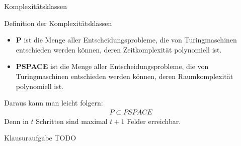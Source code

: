 \begin{frame}{Komplexitätsklassen}
    \begin{block}{Definition der Komplexitätsklassen}
        \begin{itemize}
            \item \textbf{P} ist die Menge aller Entscheidungsprobleme, die von Turingmaschinen entschieden werden können, deren Zeitkomplexität polynomiell ist.
            \item \textbf{PSPACE} ist die Menge aller Entscheidungsprobleme, die von Turingmaschinen entschieden werden können, deren Raumkomplexität polynomiell ist.
        \end{itemize}
        Daraus kann man leicht folgern:
        \begin{align*}
            P \subset PSPACE
        \end{align*}
        Denn in $t$ Schritten sind maximal $t+1$ Felder erreichbar.
    \end{block}
\end{frame}
\begin{frame}{Klausuraufgabe}
    TODO
\end{frame}


